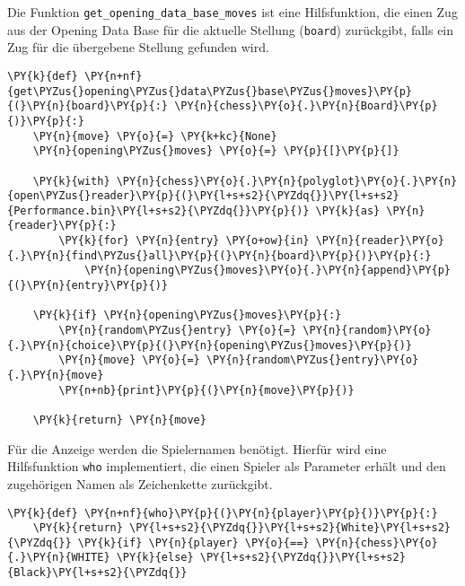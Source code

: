     Die Funktion \texttt{get\_opening\_data\_base\_moves} ist eine
Hilfsfunktion, die einen Zug aus der Opening Data Base für die aktuelle
Stellung (\texttt{board}) zurückgibt, falls ein Zug für die übergebene
Stellung gefunden wird.

\bigskip

    \begin{tcolorbox}[fontupper=\linespread{.66}\selectfont, breakable, size=fbox, boxrule=1pt, pad at break*=1mm,colback=cellbackground, colframe=cellborder]
\begin{Verbatim}[commandchars=\\\{\}]
\PY{k}{def} \PY{n+nf}{get\PYZus{}opening\PYZus{}data\PYZus{}base\PYZus{}moves}\PY{p}{(}\PY{n}{board}\PY{p}{:} \PY{n}{chess}\PY{o}{.}\PY{n}{Board}\PY{p}{)}\PY{p}{:}
    \PY{n}{move} \PY{o}{=} \PY{k+kc}{None}
    \PY{n}{opening\PYZus{}moves} \PY{o}{=} \PY{p}{[}\PY{p}{]}

    \PY{k}{with} \PY{n}{chess}\PY{o}{.}\PY{n}{polyglot}\PY{o}{.}\PY{n}{open\PYZus{}reader}\PY{p}{(}\PY{l+s+s2}{\PYZdq{}}\PY{l+s+s2}{Performance.bin}\PY{l+s+s2}{\PYZdq{}}\PY{p}{)} \PY{k}{as} \PY{n}{reader}\PY{p}{:}
        \PY{k}{for} \PY{n}{entry} \PY{o+ow}{in} \PY{n}{reader}\PY{o}{.}\PY{n}{find\PYZus{}all}\PY{p}{(}\PY{n}{board}\PY{p}{)}\PY{p}{:}
            \PY{n}{opening\PYZus{}moves}\PY{o}{.}\PY{n}{append}\PY{p}{(}\PY{n}{entry}\PY{p}{)}

    \PY{k}{if} \PY{n}{opening\PYZus{}moves}\PY{p}{:}
        \PY{n}{random\PYZus{}entry} \PY{o}{=} \PY{n}{random}\PY{o}{.}\PY{n}{choice}\PY{p}{(}\PY{n}{opening\PYZus{}moves}\PY{p}{)}
        \PY{n}{move} \PY{o}{=} \PY{n}{random\PYZus{}entry}\PY{o}{.}\PY{n}{move}
        \PY{n+nb}{print}\PY{p}{(}\PY{n}{move}\PY{p}{)}

    \PY{k}{return} \PY{n}{move}
\end{Verbatim}
\end{tcolorbox}

    Für die Anzeige werden die Spielernamen benötigt. Hierfür wird eine
Hilfsfunktion \texttt{who} implementiert, die einen Spieler als
Parameter erhält und den zugehörigen Namen als Zeichenkette zurückgibt.

\bigskip

    \begin{tcolorbox}[fontupper=\linespread{.66}\selectfont, breakable, size=fbox, boxrule=1pt, pad at break*=1mm,colback=cellbackground, colframe=cellborder]
\begin{Verbatim}[commandchars=\\\{\}]
\PY{k}{def} \PY{n+nf}{who}\PY{p}{(}\PY{n}{player}\PY{p}{)}\PY{p}{:}
    \PY{k}{return} \PY{l+s+s2}{\PYZdq{}}\PY{l+s+s2}{White}\PY{l+s+s2}{\PYZdq{}} \PY{k}{if} \PY{n}{player} \PY{o}{==} \PY{n}{chess}\PY{o}{.}\PY{n}{WHITE} \PY{k}{else} \PY{l+s+s2}{\PYZdq{}}\PY{l+s+s2}{Black}\PY{l+s+s2}{\PYZdq{}}
\end{Verbatim}
\end{tcolorbox}


